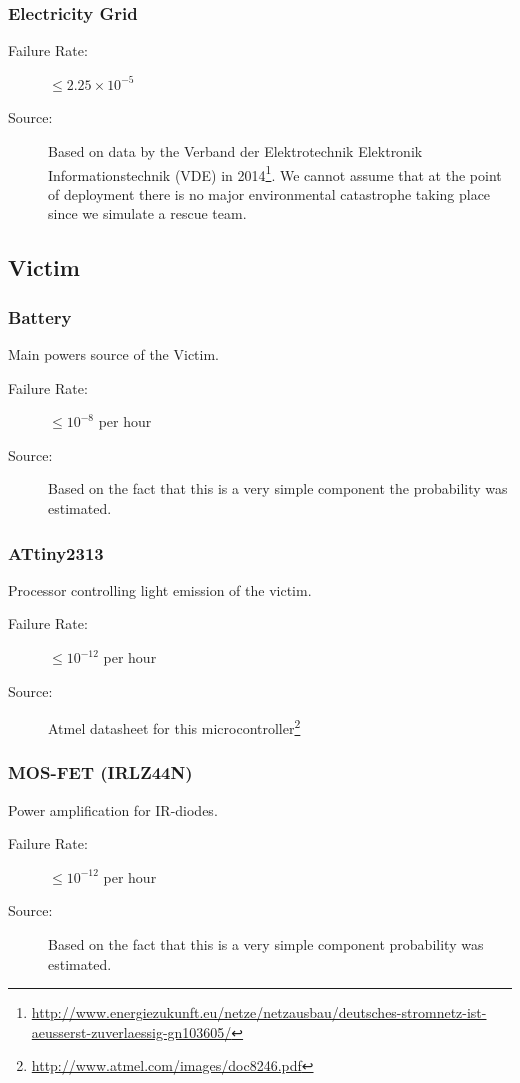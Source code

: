\documentclass[a4paper,parskip,headheight=38pt]{scrartcl} %
\begin{document}
\subsubsection{Electricity Grid}
\begin{description}
\item[Failure Rate:] $\leq 2.25 \times 10^{-5}$ %
\item[Source:] Based on data by the Verband der Elektrotechnik Elektronik Informationstechnik (VDE) in 2014\footnote{\url{http://www.energiezukunft.eu/netze/netzausbau/deutsches-stromnetz-ist-aeusserst-zuverlaessig-gn103605/}}. 
We cannot assume that at the point of deployment there is no major environmental catastrophe taking place since we simulate a rescue team.
\end{description}

\subsection{Victim} %

\subsubsection{Battery}
Main powers source of the Victim.
\begin{description}
\item[Failure Rate:] $\leq 10^{-8}$ per hour
\item[Source:] Based on the fact that this is a very simple component the probability was estimated.
\end{description}

\subsubsection{ATtiny2313}
Processor controlling light emission of the victim.
\begin{description}
\item[Failure Rate:] $\leq 10^{-12}$ per hour
\item[Source:] Atmel datasheet for this microcontroller\footnote{\url{http://www.atmel.com/images/doc8246.pdf}}
\end{description}

\subsubsection{MOS-FET (IRLZ44N)}
Power amplification for IR-diodes.
\begin{description}
\item[Failure Rate:] $\leq 10^{-12}$ per hour
\item[Source:] Based on the fact that this is a very simple component probability was estimated.
\end{description}
\end{document}

